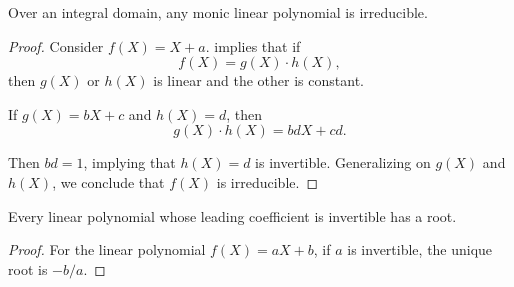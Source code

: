 \begin{proposition}\label{thm:linear_monic_polynomial_irreducible}
  Over an integral domain, any monic linear polynomial is irreducible.
\end{proposition}
\begin{proof}
  Consider \( f(X) = X + a \).  implies that if
  \begin{equation*}
    f(X) = g(X) \cdot h(X),
  \end{equation*}
  then \( g(X) \) or \( h(X) \) is linear and the other is constant.

  If \( g(X) = bX + c \) and \( h(X) = d \), then
  \begin{equation*}
    g(X) \cdot h(X) = bdX + cd.
  \end{equation*}

  Then \( bd = 1 \), implying that \( h(X) = d \) is invertible. Generalizing on \( g(X) \) and \( h(X) \), we conclude that \( f(X) \) is irreducible.
\end{proof}

\begin{lemma}\label{thm:linear_polynomial_over_field_has_root}
  Every linear polynomial whose leading coefficient is invertible has a root.
\end{lemma}
\begin{proof}
  For the linear polynomial \( f(X) = aX + b \), if \( a \) is invertible, the unique root is \( -b/a \).
\end{proof}

